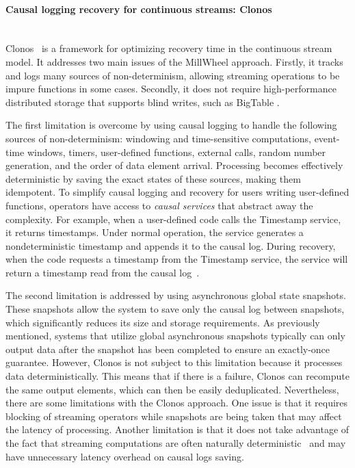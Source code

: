 \paragraph{Causal logging recovery for continuous streams: Clonos} \mbox{} \\

Clonos~\cite{silvestre2021clonos} is a framework for optimizing recovery time in the continuous stream model. It addresses two main issues of the MillWheel approach. Firstly, it tracks and logs many sources of non-determinism, allowing streaming operations to be impure functions in some cases. Secondly, it does not require high-performance distributed storage that supports blind writes, such as BigTable \cite{chang2008bigtable}.

The first limitation is overcome by using causal logging to handle the following sources of non-determinism: windowing and time-sensitive computations, event-time windows, timers, user-defined functions, external calls, random number generation, and the order of data element arrival. Processing becomes effectively deterministic by saving the exact states of these sources, making them idempotent. To simplify causal logging and recovery for users writing user-defined functions, operators have access to {\em causal services} that abstract away the complexity. For example, when a user-defined code calls the Timestamp service, it returns timestamps. Under normal operation, the service generates a nondeterministic timestamp and appends it to the causal log. During recovery, when the code requests a timestamp from the Timestamp service, the service will return a timestamp read from the causal log~\cite{silvestre2021clonos}.

The second limitation is addressed by using asynchronous global state snapshots. These snapshots allow the system to save only the causal log between snapshots, which significantly reduces its size and storage requirements. As previously mentioned, systems that utilize global asynchronous snapshots typically can only output data after the snapshot has been completed to ensure an exactly-once guarantee. However, Clonos is not subject to this limitation because it processes data deterministically. This means that if there is a failure, Clonos can recompute the same output elements, which can then be easily deduplicated. Nevertheless, there are some limitations with the Clonos approach. One issue is that it requires blocking of streaming operators while snapshots are being taken that may affect the latency of processing. Another limitation is that it does not take advantage of the fact that streaming computations are often naturally deterministic~\cite{Wang:2019:LSF:3341301.3359653, silvestre2021clonos} and may have unnecessary latency overhead on causal logs saving.

